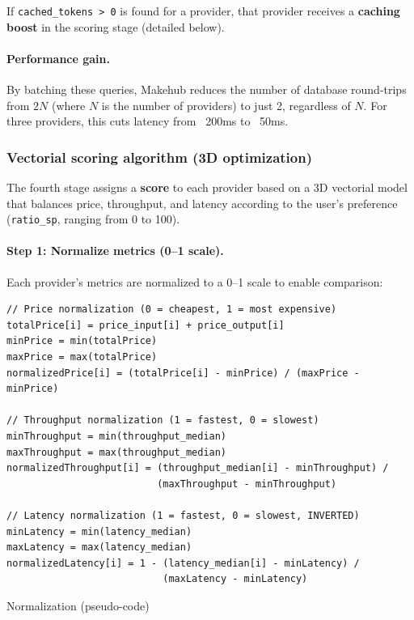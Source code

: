\documentclass[english]{article}
\begin{document}
If \texttt{cached\_tokens > 0} is found for a provider, that provider receives a \textbf{caching boost} in the scoring stage (detailed below).

\paragraph{Performance gain.}

By batching these queries, Makehub reduces the number of database round-trips from $2N$ (where $N$ is the number of providers) to just 2, regardless of $N$. For three providers, this cuts latency from ~200ms to ~50ms.

\subsubsection{Vectorial scoring algorithm (3D optimization)}

The fourth stage assigns a \textbf{score} to each provider based on a 3D vectorial model that balances price, throughput, and latency according to the user's preference (\texttt{ratio\_sp}, ranging from 0 to 100).

\paragraph{Step 1: Normalize metrics (0–1 scale).}

Each provider's metrics are normalized to a 0–1 scale to enable comparison:

\begin{listing}[H]
\begin{verbatim}
// Price normalization (0 = cheapest, 1 = most expensive)
totalPrice[i] = price_input[i] + price_output[i]
minPrice = min(totalPrice)
maxPrice = max(totalPrice)
normalizedPrice[i] = (totalPrice[i] - minPrice) / (maxPrice - minPrice)

// Throughput normalization (1 = fastest, 0 = slowest)
minThroughput = min(throughput_median)
maxThroughput = max(throughput_median)
normalizedThroughput[i] = (throughput_median[i] - minThroughput) /
                          (maxThroughput - minThroughput)

// Latency normalization (1 = fastest, 0 = slowest, INVERTED)
minLatency = min(latency_median)
maxLatency = max(latency_median)
normalizedLatency[i] = 1 - (latency_median[i] - minLatency) /
                           (maxLatency - minLatency)
\end{verbatim}
\caption{Normalization (pseudo-code)}
\end{listing}
\end{document}
